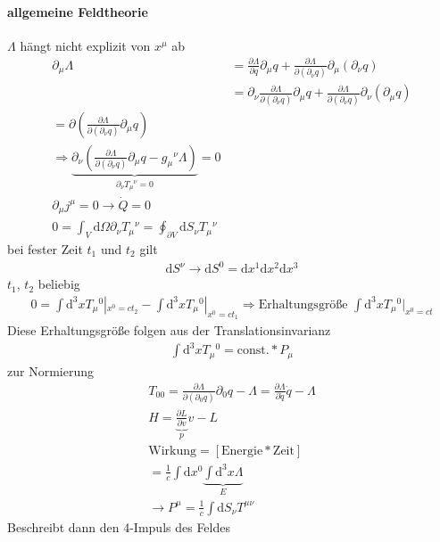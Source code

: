 \documentclass[a4paper]{article}
\begin{document}
\paragraph{allgemeine Feldtheorie}
$\Lambda$ hängt nicht explizit von $x^\mu$ ab
\begin{align}
\partial_\mu \Lambda &= \frac{\partial \Lambda}{\partial q}
\partial_\mu\!q+\frac{\partial \Lambda}{\partial(\partial_\nu
q)}\partial_\mu(\partial_\nu q)\\
&=\partial_\nu \frac{\partial \Lambda}{\partial (\partial_\nu q)}
\partial_\mu\!q+\frac{\partial \Lambda}{\partial(\partial_\nu
q)}\partial_\nu(\partial_\mu q)\\
=\partial\left( \frac{\partial \Lambda}{\partial(\partial_\nu q)}\partial_\mu q
\right)\\
\Rightarrow \underbrace{\partial_\nu \left( \frac{\partial
\Lambda}{\partial(\partial_\nu q)}\partial_\mu q - g_\mu{}^\nu \Lambda
\right)}_{\partial_\nu T_\mu{}^\nu=0}=0\\
\partial_\mu j^\mu=0 \rightarrow \dot{Q}=0\\
0=\int_V \mathrm{d}\Omega \partial_\nu T_\mu{}^{\nu}=\oint_{\partial V} \mathrm{d}S_\nu
T_\mu{}^\nu
\end{align}
bei fester Zeit $t_1$ und $t_2$ gilt 
\begin{align}
\mathrm{d}S^\nu \rightarrow \mathrm{d}S^0=\mathrm{d}x^1\mathrm{d}x^2\mathrm{d}x^3
\end{align}
$t_1$, $t_2$ beliebig
\begin{align}
0=\int \mathrm{d}^3x T_\mu{}^0|_{x^0=ct_2}-\int \mathrm{d}^3x T_\mu{}^0|_{x^0=ct_1}
\Rightarrow \text{Erhaltungsgröße } \int \mathrm{d}^3x T_\mu{}^0|_{x^0=ct}
\end{align}
Diese Erhaltungsgröße folgen aus der Translationsinvarianz
\begin{align}
\int \mathrm{d}^3x T_\mu{}^0=\text{const.}* P_\mu
\end{align}
zur Normierung
\begin{align}
T_{00}=\frac{\partial \Lambda}{\partial(\partial_0 q)}\partial_0 q
-\Lambda=\frac{\partial \Lambda}{\partial \dot{q}}\dot{q}-\Lambda\\
H=\underbrace{\frac{\partial L}{\partial v}}_{p} v-L\\
\text{Wirkung}=\left[ \text{Energie}*\text{Zeit}\right]\\
=\frac{1}{c}\int \mathrm{d}x^0\underbrace{\int \mathrm{d}^3x\Lambda}_{E}\\
\rightarrow P^\mu=\frac{1}{c}\int \mathrm{d}S_\nu T^{\mu\nu}
\end{align}
Beschreibt dann den 4-Impuls des Feldes
\end{document}
